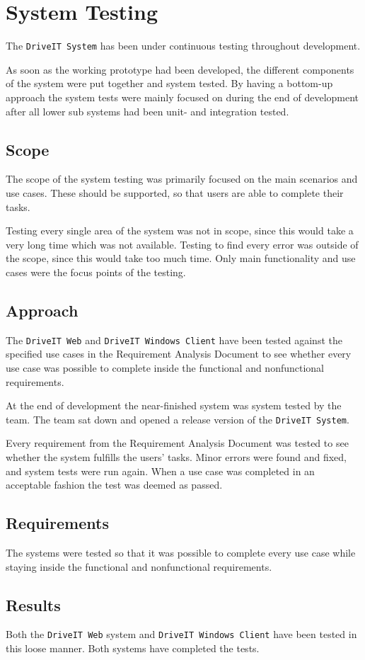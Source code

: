\section{System Testing}
The \texttt{DriveIT System} has been under continuous testing throughout development.

As soon as the working prototype had been developed, the different components of the system were put together and system tested. 
By having a bottom-up approach the system tests were mainly focused on during the end of development after all lower sub systems had been unit- and integration tested.

\subsection{Scope}
The scope of the system testing was primarily focused on the main scenarios and use cases. 
These should be supported, so that users are able to complete their tasks. 

Testing every single area of the system was not in scope, since this would take a very long time which was not available.
Testing to find every error was outside of the scope, since this would take too much time. Only main functionality and use cases were the focus points of the testing.

\subsection{Approach}
The \texttt{DriveIT Web} and \texttt{DriveIT Windows Client} have been tested against the specified use cases in the Requirement Analysis Document to see whether every use case was possible to complete inside the functional and nonfunctional requirements.

At the end of development the near-finished system was system tested by the team. The team sat down and opened a release version of the \texttt{DriveIT System}.

Every requirement from the Requirement Analysis Document was tested to see whether the system fulfills the users' tasks.
Minor errors were found and fixed, and system tests were run again.
When a use case was completed in an acceptable fashion the test was deemed as passed.

\subsection{Requirements}
The systems were tested so that it was possible to complete every use case while staying inside the functional and nonfunctional requirements.

\subsection{Results}
Both the \texttt{DriveIT Web} system and \texttt{DriveIT Windows Client} have been tested in this loose manner. 
Both systems have completed the tests.